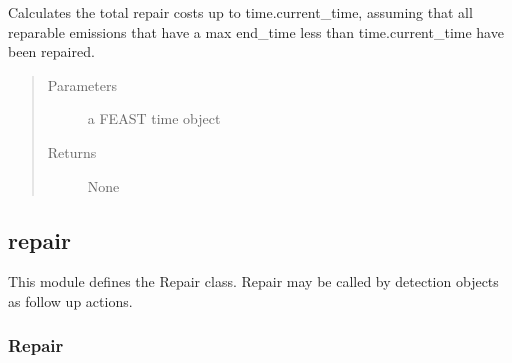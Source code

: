 \documentclass[letterpaper,10pt,english]{sphinxmanual}
\begin{document}
\begin{fulllineitems}
\begin{fulllineitems}
\label{\detokenize{index:feast.DetectionModules.ldar_program.LDARProgram.calc_rep_costs}}
Calculates the total repair costs up to time.current\_time, assuming that all reparable emissions that have a
max end\_time less than time.current\_time have been repaired.
\begin{quote}\begin{description}
\item[{Parameters}] \leavevmode
{} \textendash{} a FEAST time object

\item[{Returns}] \leavevmode
None

\end{description}\end{quote}

\end{fulllineitems}


\end{fulllineitems}



\subsection{repair}
\label{\detokenize{index:module-feast.DetectionModules.repair}}\label{\detokenize{index:repair}}
This module defines the Repair class. Repair may be called by detection objects as follow up actions.


\subsubsection{Repair}
\label{\detokenize{index:id1}}
\end{document}
